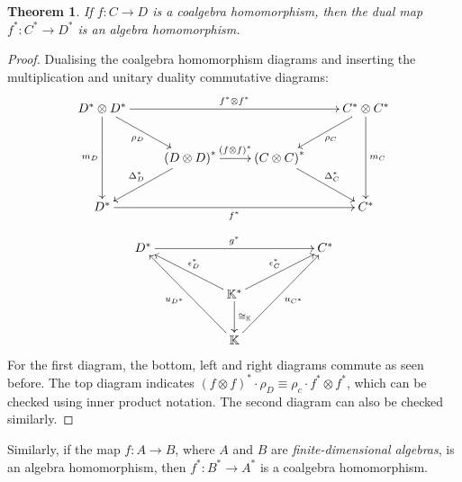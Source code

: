 \documentclass{article}
\newtheorem{Theorem}{Theorem}
\theoremstyle{definition}
\theoremstyle{remark}
\theoremstyle{underline}
\theoremstyle{underline}
\begin{document}
	\begin{Theorem}
		If $f\colon C \to D$ is a coalgebra homomorphism, then the dual map $f^*\colon C^* \to D^*$ is an algebra homomorphism.
	\end{Theorem}
	\begin{proof}
		Dualising the coalgebra homomorphism diagrams and inserting the multiplication and unitary duality commutative diagrams:
		\begin{align*}
		\xymatrix{
			D^* \otimes D^* \ar[dd]_-{m_D} \ar[rd]_-{\rho_D} \ar[rrr]^-{f^* \otimes f^*} & & & C^* \otimes C^* \ar[ld]^-{\rho_C} \ar[dd]^-{m_C} \\
			& \pqty{D \otimes D}^* \ar[r]^-{\pqty{f \otimes f}^*} \ar[ld]_-{\Delta^*_D} & \pqty{C \otimes C}^* \ar[rd]^-{\Delta^*_C} & \\
			D^* \ar[rrr]_-{f^*} & & & C^*
		}
		\end{align*}
		\begin{align*}
			\xymatrix{
			D^* \ar[rrrr]^-{g^*} & & & & C^*  \\
			& & \mathbb K^* \ar[llu]_-{\epsilon^*_D} \ar[d]^-{\cong_{\mathbb K}} \ar[rru]^-{\epsilon^*_C} & & \\
			& & \mathbb K \ar[lluu]^-{u_{D^*}} \ar[rruu]_-{u_{C^*}} & & 
		}
		\end{align*}
		For the first diagram, the bottom, left and right diagrams commute as seen before. The top diagram indicates $(f \otimes f)^* \cdot \rho_D \equiv \rho_c \cdot f^* \otimes f^*$, which can be checked using inner product notation. The second diagram can also be checked similarly.
	\end{proof}
	Similarly, if the map $f\colon A \to B$, where $A$ and $B$ are \emph{finite-dimensional algebras}, is an algebra homomorphism, then $f^* \colon B^* \to A^*$ is a coalgebra homomorphism. 
\end{document}
